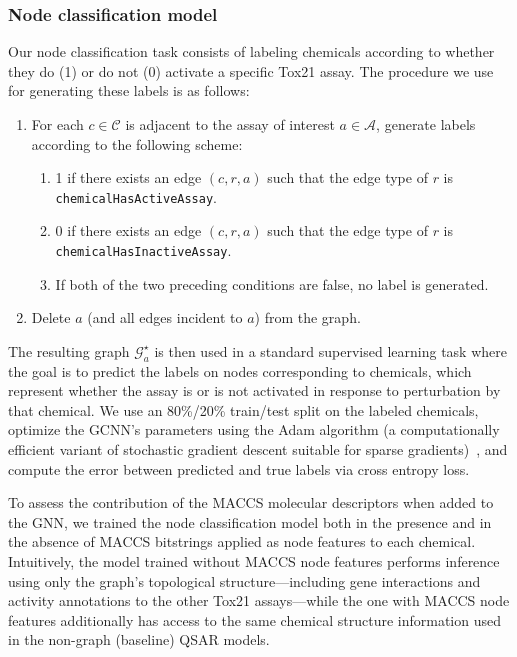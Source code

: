 \documentclass{ws-procs11x85}
\begin{document}
\subsubsection{Node classification model}
Our node classification task consists of labeling chemicals according to whether they do (1) or do not (0) activate a specific Tox21 assay.
The procedure we use for generating these labels is as follows:
\begin{enumerate}
   \item For each $c \in \mathcal{C}$ is adjacent to the assay of interest $a \in \mathcal{A}$, generate labels according to the following scheme:
   \begin{enumerate}
      \item 1 if there exists an edge $(c, r, a)$ such that the edge type of $r$ is \texttt{chemicalHasActiveAssay}.
      \item 0 if there exists an edge $(c, r, a)$ such that the edge type of $r$ is \texttt{chemicalHasInactiveAssay}.
      \item If both of the two preceding conditions are false, no label is generated.
   \end{enumerate}
   \item Delete $a$ (and all edges incident to $a$) from the graph.
\end{enumerate}
The resulting graph $\mathcal{G}_a^\star$ is then used in a standard supervised learning task where the goal is to predict the labels on nodes corresponding to chemicals, which represent whether the assay is or is not activated in response to perturbation by that chemical.
We use an 80\%/20\% train/test split on the labeled chemicals, optimize the GCNN's parameters using the Adam algorithm (a computationally efficient variant of stochastic gradient descent suitable for sparse gradients)~\cite{kingma2014adam}, and compute the error between predicted and true labels via cross entropy loss.

To assess the contribution of the MACCS molecular descriptors when added to the GNN, we trained the node classification model both in the presence and in the absence of MACCS bitstrings applied as node features to each chemical.
Intuitively, the model trained without MACCS node features performs inference using only the graph's topological structure---including gene interactions and activity annotations to the other Tox21 assays---while the one with MACCS node features additionally has access to the same chemical structure information used in the non-graph (baseline) QSAR models.
\end{document}
